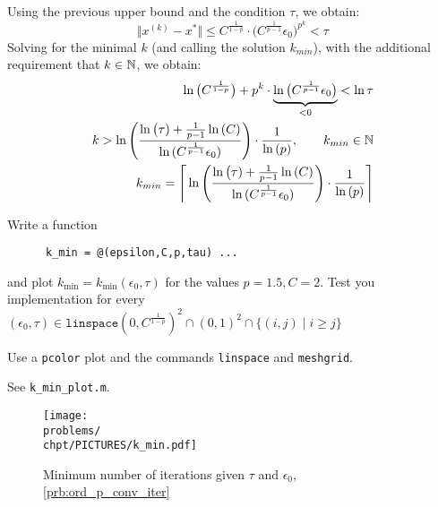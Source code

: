 \begin{problem}
\begin{subproblem}[2]
    \begin{solution}
      Using the previous upper bound and the condition $\tau$, we obtain: 
      $$ \Vert x^{(k)}-x^*\Vert \le C^{\frac{1}{1-p}}\cdot\Big(C^{\frac{1}{p-1}}\epsilon_0\Big)^{p^k}<\tau$$
      Solving for the minimal $k$ (and calling the solution $k_{min}$), with the additional requirement that $k \in \mathbb{N}$, we obtain:
      \begin{align*}
      \ln{\big(C^{\frac{1}{1-p}}\big)} + p^k\cdot\underbrace{\ln{\big(C^{\frac{1}{p-1}}\epsilon_0}\big)}_
                                         {<0} < \ln{\tau} \notag \\
      k>\ln{\Bigg(\frac{ \ln{\big(\tau)}+\frac{1}{p-1}\ln{(C)}}{\ln{(C^{\frac{1}{p-1}}\epsilon_0)}}}\Bigg)\cdot\frac{1}{\ln{(p)}},\qquad k_{min} \in \mathbb{N} \\
      k_{min} = \Bigg\lceil\ln{\Bigg(\frac{ \ln{\big(\tau)}+\frac{1}{p-1}\ln{(C)}}{\ln{(C^{\frac{1}{p-1}}\epsilon_0)}}}\Bigg)\cdot\frac{1}{\ln{(p)}}\Bigg\rceil  \notag
      \end{align*}
    \end{solution}

    \end{subproblem}
    
    \begin{subproblem}[1]
    Write a \matlab{} function 
    
    \begin{verbatim}
      k_min = @(epsilon,C,p,tau) ...
    \end{verbatim} and plot 
    $k_{\min}=k_{\min}(\epsilon_0,\tau)$ for the values $p=1.5, C=2$. Test you implementation for every $(\epsilon_0, \tau)  \in \mathtt{linspace}(0,C^{\frac{1}{1-p}})^2 \cap (0,1)^2 \cap \{(i,j) \; | \; i \geq j  \}$
    
    \begin{hint}
     Use a \Matlab{} \verb|pcolor| plot and the commands \verb|linspace| and  \verb|meshgrid|.
    \end{hint}

    
   \cprotEnv \begin{solution}
   See \verb|k_min_plot.m|.
   


\begin{figure}
    \texttt{[image: \\problems/\\chpt/PICTURES/k\_min.pdf]}
\caption{Minimum number of iterations given $\tau$ and $\epsilon_0$, \ref{prb:ord_p_conv_iter}}
\end{figure}
    \end{solution}

    \end{subproblem}
\end{problem}